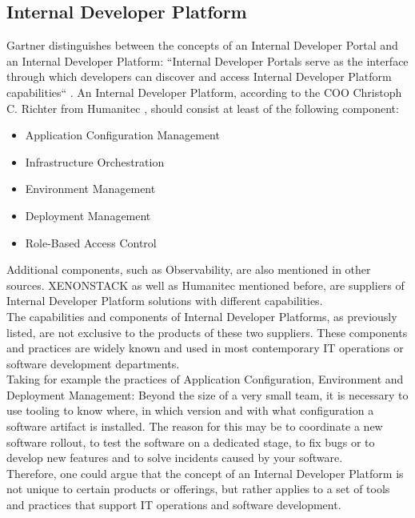 \documentclass[a4paper,10pt]{article}
\begin{document}
    \subsection{Internal Developer Platform}
    \label{subsec:vpplatform}
    Gartner distinguishes between the concepts of an Internal Developer Portal and an Internal Developer Platform:
    ``Internal Developer Portals serve as the interface through which developers can discover and
    access Internal Developer Platform capabilities``\parencite{gartner} .
    An Internal Developer Platform, according to the COO Christoph C. Richter from Humanitec\parencite{richteretal} ,
    should consist at least of the following component:
    \begin{itemize}
        \item Application Configuration Management
        \item Infrastructure Orchestration
        \item Environment Management
        \item Deployment Management
        \item Role-Based Access Control
    \end{itemize}
    Additional components, such as Observability, are also mentioned in other sources\parencite{xenon}.
    XENONSTACK as well as Humanitec mentioned before, are suppliers of Internal Developer Platform solutions with
    different capabilities.\\
    The capabilities and components of Internal Developer Platforms, as previously listed, are not exclusive to the
    products of these two suppliers.
    These components and practices are widely known and used in most contemporary IT operations or software development
    departments.\\
    Taking for example the practices of Application Configuration, Environment and Deployment Management:
    Beyond the size of a very small team, it is necessary to use tooling to know where, in which version
    and with what configuration a software artifact is installed.
    The reason for this may be to coordinate a new software rollout, to test the software on a dedicated stage, to fix bugs
    or to develop new features and to solve incidents caused by your software.\\
    Therefore, one could argue that the concept of an Internal Developer Platform is not unique to certain products or
    offerings, but rather applies to a set of tools and practices that support IT operations and software development.
\end{document}
